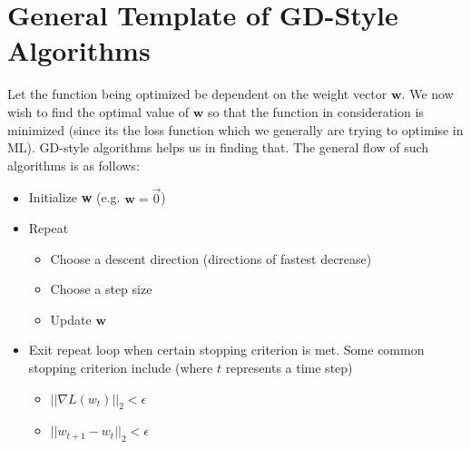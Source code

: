 \documentclass{report}
\begin{document}
\section{General Template of GD-Style Algorithms}
Let the function being optimized be dependent on the weight vector $\textbf{w}$. We now wish to find the optimal value of $\textbf{w}$ so that the function in consideration is minimized (since its the loss function which we generally are trying to optimise in ML). GD-style algorithms helps us in finding that. The general flow of such algorithms is as follows:
\begin{itemize}
  \item Initialize {\textbf{w}} (e.g. ${\textbf{w}} = \Vec{0}$)
  \item Repeat
        \begin{itemize}
          \item Choose a descent direction (directions of fastest decrease)
          \item Choose a step size
          \item Update ${\textbf{w}}$
        \end{itemize}
  \item Exit repeat loop when certain stopping criterion is met. Some common stopping criterion include  (where $t$ represents a time step)
        \begin{itemize}
          \item $|| \nabla L(w_{t}) ||_{2} < \epsilon$
          \item $|| {w_{t+1} - w_{t}} ||_{2} < \epsilon$
        \end{itemize}
\end{itemize}
\end{document}
